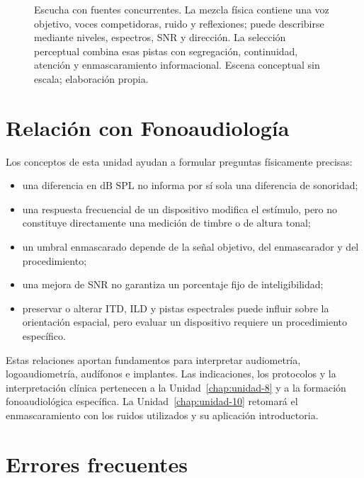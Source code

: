 \begin{figure}[htbp]
    \centering
    
    \caption{Escucha con fuentes concurrentes. La mezcla física contiene una
    voz objetivo, voces competidoras, ruido y reflexiones; puede describirse
    mediante niveles, espectros, SNR y dirección. La selección perceptual
    combina esas pistas con segregación, continuidad, atención y
    enmascaramiento informacional. Escena conceptual sin escala; elaboración
    propia.}
    \label{fig:u7-fuentes-concurrentes}
\end{figure}
\section{Relación con Fonoaudiología}
\label{sec:u7-relacion-fonoaudiologia}

Los conceptos de esta unidad ayudan a formular preguntas físicamente
precisas:

\begin{itemize}
    \item una diferencia en \(\text{dB SPL}\) no informa por sí sola una
    diferencia de sonoridad;
    \item una respuesta frecuencial de un dispositivo modifica el estímulo,
    pero no constituye directamente una medición de timbre o de altura tonal;
    \item un umbral enmascarado depende de la señal objetivo, del enmascarador
    y del procedimiento;
    \item una mejora de SNR no garantiza un porcentaje fijo de
    inteligibilidad;
    \item preservar o alterar ITD, ILD y pistas espectrales puede influir sobre
    la orientación espacial, pero evaluar un dispositivo requiere un
    procedimiento específico.
\end{itemize}

Estas relaciones aportan fundamentos para interpretar audiometría,
logoaudiometría, audífonos e implantes. Las indicaciones, los protocolos y la
interpretación clínica pertenecen a la Unidad~\ref{chap:unidad-8} y a la formación
fonoaudiológica específica. La Unidad~\ref{chap:unidad-10} retomará el enmascaramiento con los
ruidos utilizados y su aplicación introductoria.

\section{Errores frecuentes}
\label{sec:u7-errores}

